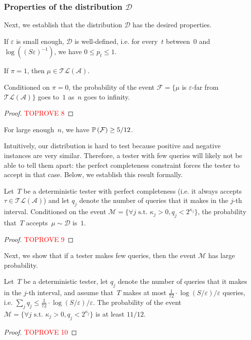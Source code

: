 \documentclass[letterpaper, USenglish, cleveref, autoref, thm-restate, numberwithinsect]{lipics-v2021}
\theoremstyle{theorem}
\theoremstyle{definition}
\newcommand{\Aa}{\mathcal{A}}
\newcommand{\Dd}{\mathcal{D}}
\newcommand{\eps}{\varepsilon}
\newcommand{\Ff}{\mathcal{F}}
\newcommand{\Mm}{\mathcal{M}}
\newcommand{\PP}{\mathbb{P}}
\newcommand{\timedlang}[1]{\mathcal{TL}( #1 )}
\newcommand{\Prob}[2][]{\ifthenelse{\equal{#1}{}}{\PP}{\PP_{ #1 }}\left( #2 \right)}
\begin{document}
\subsubsection{Properties of the distribution $\Dd$}
Next, we establish that the distribution $\Dd$ has the desired properties.
\begin{observation}
    If $\eps$ is small enough, $\Dd$ is well-defined, i.e. for every~$t$ between~$0$ and $\log(( S\eps)^{-1})$, we have $0 \le p_t \le 1$.
\end{observation}

\begin{observation}
    If $\pi = 1$, then $\mu\in \timedlang{\Aa}$.
\end{observation}

\begin{lemma}\label{lemma:far-whp}
    Conditioned on $\pi = 0$, the probability of the event $\Ff = \{ \mu$ is $\eps$-far from $\timedlang{\Aa} \}$ goes to~$1$ as~$n$ goes to infinity.
\end{lemma}
\begin{proof}\textcolor{red}{TOPROVE 8}\end{proof}

\begin{corollary}\label{coro:large-fail-proba}
    For large enough~$n$, we have $\Prob{\Ff} \ge 5/12$.
\end{corollary}

Intuitively, our distribution is hard to test because positive and negative instances are very similar.
Therefore, a tester with few queries will likely not be able to tell them apart: the perfect completeness constraint forces the tester to accept in that case.
Below, we establish this result formally.
\begin{lemma}\label{lemma:must-accept}
    Let~$T$ be a deterministic tester with perfect completeness (i.e. it always accepts $\tau\in \timedlang{\Aa}$) and let $q_j$ denote the number of queries that it makes in the $j$-th interval.
    Conditioned on the event $\Mm = \{\forall j \text{ s.t. }\kappa_j > 0, q_j < 2^{\kappa_j}\}$, the probability that~$T$ accepts~$\mu \sim{}\Dd$ is~$1$.
\end{lemma}
\begin{proof}\textcolor{red}{TOPROVE 9}\end{proof}

Next, we show that if a tester makes few queries, then the event $\Mm$ has large probability.

\begin{lemma}\label{lemma:proba-fail}
    Let~$T$ be a deterministic tester, let $q_j$ denote the number of queries that it makes in the $j$-th interval, and assume that~$T$ makes at most $\frac{1}{72}\cdot \log(S/\eps)/\eps$ queries, i.e. $\sum_j q_j \le \frac{1}{72}\cdot \log(S/\eps)/\eps$.
    The probability of the event $\Mm = \{\forall j \text{ s.t. }\kappa_j > 0, q_j < 2^{\kappa_j}\}$ is at least $11/12$.
\end{lemma}
\begin{proof}\textcolor{red}{TOPROVE 10}\end{proof}
\end{document}
